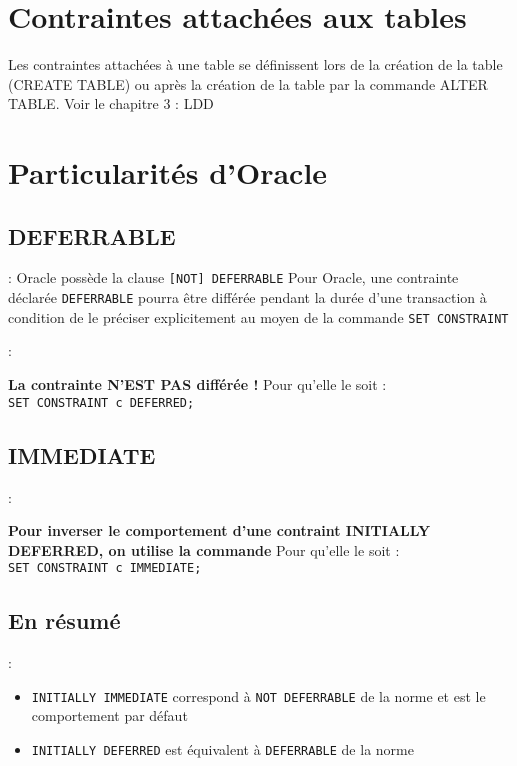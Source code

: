 \documentclass[10pt]{beamer}
\begin{document}
\section{Contraintes attachées aux tables}
\begin{frame}{\secname}
    Les contraintes attachées à une table se définissent lors de la création de la table (CREATE TABLE) ou après la création de la table par la commande ALTER TABLE.
    Voir le chapitre 3 : LDD
\end{frame}

\section{Particularités d'Oracle}
\subsection{DEFERRABLE}
\begin{frame}{\secname : \subsecname}
    Oracle possède la clause \lstinline[language=plsql]![NOT] DEFERRABLE!
    Pour Oracle, une contrainte déclarée \lstinline[language=plsql]!DEFERRABLE! pourra être différée pendant la durée d'une transaction à condition de le préciser explicitement au moyen de la commande \lstinline[language=plsql]!SET CONSTRAINT!
\end{frame}

\begin{frame}{\secname : \subsecname}
    
    \textbf{La contrainte N'EST PAS différée !}
    Pour qu'elle le soit : \\
    \lstinline[language=plsql]!SET CONSTRAINT c DEFERRED;!
\end{frame}
\subsection{IMMEDIATE}

\begin{frame}{\secname : \subsecname}
    
    \textbf{Pour inverser le comportement d'une contraint INITIALLY DEFERRED, on utilise la commande}
    Pour qu'elle le soit : \\
    \lstinline[language=plsql]!SET CONSTRAINT c IMMEDIATE;!
\end{frame}

\subsection{En résumé}
\begin{frame}{\secname : \subsecname}
    \begin{itemize}
        \item \lstinline[language=plsql]!INITIALLY IMMEDIATE! correspond à \lstinline[language=plsql]!NOT DEFERRABLE! de la norme et est le comportement par défaut
        \item \lstinline[language=plsql]!INITIALLY DEFERRED! est équivalent à \lstinline[language=plsql]!DEFERRABLE! de la norme
    \end{itemize}
\end{frame}
\end{document}
